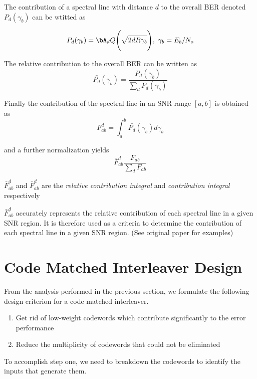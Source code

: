 \documentclass[11pt, oneside, dvipdfmx]{book}
\begin{document}
 The contribution of a spectral line with distance $d$ to the overall BER denoted $P_d(\gamma_b)$ can be wtitted as 
 
 \begin{equation}
 P_d(\gamma_b) =\bA_dQ \Bigg( \sqrt{2dR\gamma_b} \Bigg),~\gamma_b=E_b/N_o
 \end{equation}
 
 The relative contribution to the overall BER can be written as 
 \begin{equation}
 \bar{P_d}(\gamma_b) =\frac{P_d(\gamma_b)}{\sum_{d}P_d(\gamma_b)}
 \end{equation}
 
 Finally the contribution of the spectral line in an SNR range $[a,b]$ is obtained as 
 \begin{equation}
 F_{ab}^{d}=\int_{a}^{b} \bar{P_d}(\gamma_b) d\gamma_b
 \end{equation}
 
 and a further normalization yields
 \begin{equation}
 \bar{F}_{ab}^{d}\frac{F_{ab}}{\sum_{d}F_{ab}}
 \end{equation}
 
  $\bar{F}_{ab}^{d}$ and  $\bar{F}_{ab}^{d}$ are the \textit{relative contribution integral} and \textit{contribution integral} respectively
 
 $\bar{F}_{ab}^{d}$ accurately represents the relative contribution of each spectral line in a given SNR region. It is therefore used as a criteria to determine the contribution of each spectral line in a given SNR region. (See original paper for examples)
 
 
 \section{Code Matched Interleaver Design}
 From the analysis performed in the previous section, we formulate the following design criterion for a code matched interleaver.
 
 \begin{enumerate}
 \item Get rid of low-weight codewords which contribute significantly to the error performance
 
 \item Reduce the multiplicity of codewords that could not be eliminated
 \end{enumerate}
 
 To accomplish step one, we need to breakdown the codewords to identify the inputs that generate them.  
 
\end{document}
